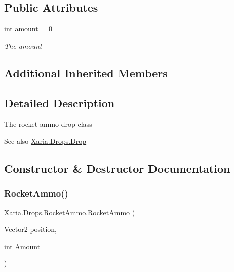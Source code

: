 \subsection*{Public Attributes}
\begin{DoxyCompactItemize}
\item 
int \hyperlink{classXaria_1_1Drops_1_1RocketAmmo_aaf708cc2d62762d36959ab4a11cdbc1e}{amount} = 0
\begin{DoxyCompactList}\small\item\em The amount \end{DoxyCompactList}\end{DoxyCompactItemize}
\subsection*{Additional Inherited Members}


\subsection{Detailed Description}
The rocket ammo drop class 

\begin{DoxySeeAlso}{See also}
\hyperlink{classXaria_1_1Drops_1_1Drop}{Xaria.\+Drops.\+Drop}


\end{DoxySeeAlso}


\subsection{Constructor \& Destructor Documentation}
\mbox{\label{classXaria_1_1Drops_1_1RocketAmmo_af81c829bd216258cc212d9349c027a13}} 
\subsubsection{\texorpdfstring{Rocket\+Ammo()}{RocketAmmo()}}
{\footnotesize\ttfamily Xaria.\+Drops.\+Rocket\+Ammo.\+Rocket\+Ammo (\begin{DoxyParamCaption}\item[{Vector2}]{position,  }\item[{int}]{Amount }\end{DoxyParamCaption})\hspace{0.3cm}{\ttfamily [inline]}}




